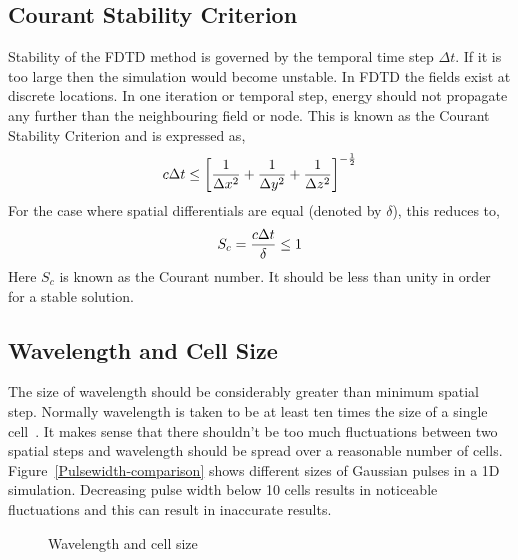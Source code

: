 \documentclass[10pt,A4paper]{report}
\begin{document}
\subsection{Courant Stability Criterion}
Stability of the FDTD method is governed by the temporal time step $\Delta t$. If it is too large then the simulation would become unstable. In FDTD the fields exist at discrete locations. In one iteration or temporal step, energy should not propagate any further than the neighbouring field or node. This is known as the Courant Stability Criterion and is expressed as,
\begin{equation}
\centering
c \Delta t \leq \left[ \dfrac{1}{\Delta x^2} + \dfrac{1}{\Delta y^2} + \dfrac{1}{\Delta z^2} \right]^{-\frac{1}{2}}
\label{Courant-Stability-Criterion}
\end{equation}
For the case where spatial differentials are equal (denoted by $\delta$), this reduces to,
\begin{equation}
\centering
S_c = \dfrac{c \Delta t}{\delta} \leq 1
\label{Courant-Stability-Criterion-Equal-Differentials}
\end{equation}
Here $S_c$ is known as the Courant number. It should be less than unity in order for a stable solution.

\subsection{Wavelength and Cell Size}
The size of wavelength should be considerably greater than minimum spatial step. Normally wavelength is taken to be at least ten times the size of a single cell~\cite{Taflove2000}. It makes sense that there shouldn't be too much fluctuations between two spatial steps and wavelength should be spread over a reasonable number of cells. Figure~\ref{Pulsewidth-comparison} shows different sizes of Gaussian pulses in a 1D simulation. Decreasing pulse width below 10 cells results in noticeable fluctuations and this can result in inaccurate results.

\begin{figure}[H]
\centering
{}
\caption{Wavelength and cell size}
\label{Wavelength-Vs-Cell-Size}
\end{figure}
\end{document}
